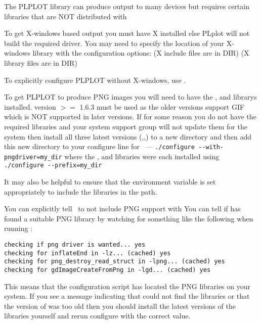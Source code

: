 \documentclass{report}
\begin{document}
The PLPLOT library can produce output to many devices but requires certain libraries that are NOT distributed with \EMBOSS

To get X-windows based output you must have X installed else PLplot will not build the
required driver. You may need to specify the location of your X-windows library with the configuration options:
          (X include files are in DIR)
         (X library files are in DIR)

To explicitly configure PLPLOT without X-windows, use .



To get PLPLOT to produce PNG images you will need to have the ,  and 
librarys installed.  version $>=$  1.6.3 must be used as
the older versions support GIF which is NOT supported in later
versions.
If for some reason you do not have the required libraries and your 
system support group will not update them for the system then install all three latest versions (,,) to a 
new directory and then add this new directory to your configure
line for \EMBOSS\ --- \verb+./configure --with-pngdriver=my_dir+
where the  ,  and  libraries were each installed using \verb+./configure --prefix=my_dir+ 

It may also be helpful to ensure that the  environment variable is set appropriately to include the libraries in the path. 

You can explicitly tell \EMBOSS\ to not include PNG support with 
You can tell if  has found a suitable PNG library
by watching for something like the following when running :
\begin{verbatim}
checking if png driver is wanted... yes
checking for inflateEnd in -lz... (cached) yes
checking for png_destroy_read_struct in -lpng... (cached) yes
checking for gdImageCreateFromPng in -lgd... (cached) yes
\end{verbatim}
This means that the configuration script has located the PNG libraries on your system. If you see a message indicating that  could not find the libraries or that the version of  was too old then you should install the latest versions of the libraries yourself and rerun configure with the correct  value.
\end{document}
